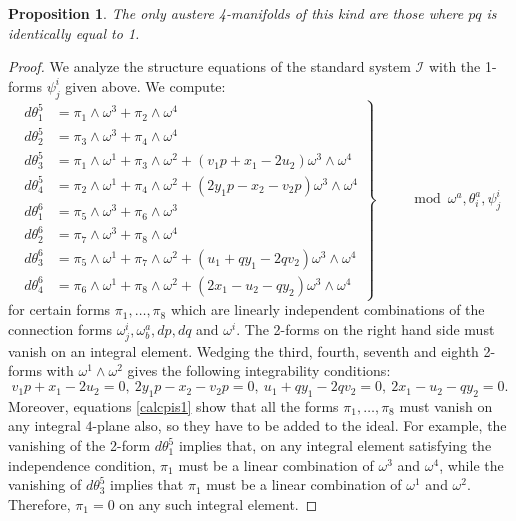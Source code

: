 \documentclass[12pt,reqno]{amsart}
\newtheorem{prop}[theorem]{Proposition}
\theoremstyle{definition}
\theoremstyle{remark}
\begin{document}
\begin{prop}\label{cutdownB}
 The only austere 4-manifolds of this kind are those where $pq$ is identically equal to 1.
\end{prop}
\begin{proof}
We analyze the structure equations of the standard system ${{\mathcal I}}$ with the 1-forms $\psi_j^i$ given above. We compute:
\begin{equation}\label{calcpis1}
\left.\begin{aligned}
d\theta^5_1&=\pi_1\wedge \omega^3+\pi_2\wedge \omega^4\\
d\theta^5_2&=\pi_3\wedge \omega^3+\pi_4\wedge \omega^4\\
d\theta^5_3&=\pi_1\wedge \omega^1+\pi_3\wedge \omega^2+(v_1p+x_1-2u_2)\omega^3\wedge \omega^4\\
d\theta^5_4&=\pi_2\wedge \omega^1+\pi_4\wedge \omega^2+( 2y_1p-x_2-v_2p)\omega^3\wedge \omega^4\\
d\theta^6_1&=\pi_5\wedge \omega^3+\pi_6\wedge \omega^3   \\
d\theta^6_2&=\pi_7\wedge \omega^3+\pi_8\wedge \omega^4\\
d\theta^6_3&=\pi_5\wedge \omega^1+\pi_7\wedge \omega^2+(u_1+qy_1-2qv_2)\omega^3\wedge \omega^4\\
d\theta^6_4&=\pi_6\wedge \omega^1+\pi_8\wedge \omega^2+(2x_1-u_2-qy_2)\omega^3\wedge \omega^4
\end{aligned}\right\}\qquad \mod \omega^a, \theta^a_i, \psi_j^i
\end{equation}
for certain forms $\pi_1, \dots, \pi_8$ which are linearly independent combinations
of the connection forms $\omega^i_j, \omega_b^a, dp, dq$ and $\omega^i$.
The 2-forms on the right hand side must vanish on an integral element.
Wedging the third, fourth, seventh and eighth 2-forms with $\omega^1\wedge\omega^2$
gives the following integrability conditions:
\begin{equation}\label{Bintcond}
v_1p+x_1-2u_2=0, \ 2y_1p-x_2-v_2p=0, \ u_1+qy_1-2qv_2=0, \ 2x_1-u_2-qy_2=0.
\end{equation}
Moreover, equations \eqref{calcpis1} show that all the forms $\pi_1, \dots, \pi_8$
must vanish on any integral $4$-plane also, so they have to be added to the ideal.
For example, the vanishing of the 2-form $d\theta^5_1$ implies that, on any integral element
satisfying the independence condition, $\pi_1$ must be a linear combination of $\omega^3$ and $\omega^4$,
while the vanishing of $d\theta^5_3$ implies that $\pi_1$ must be a linear combination of $\omega^1$ and $\omega^2$.
Therefore, $\pi_1=0$ on any such integral element.


\end{proof}
\end{document}
